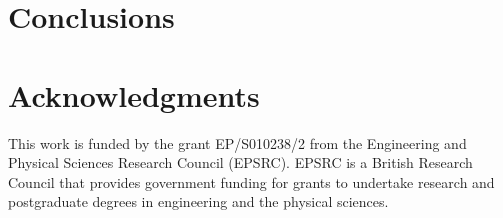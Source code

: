 \documentclass{egpubl}
\begin{document}
\section{Conclusions}


\section{Acknowledgments}
This work is funded by the grant EP/S010238/2 from the Engineering and Physical Sciences Research Council (EPSRC). EPSRC is a British Research Council that provides government funding for grants to undertake research and postgraduate degrees in engineering and the physical sciences.

\let\section=\origsection
\printbibliography
\end{document}

